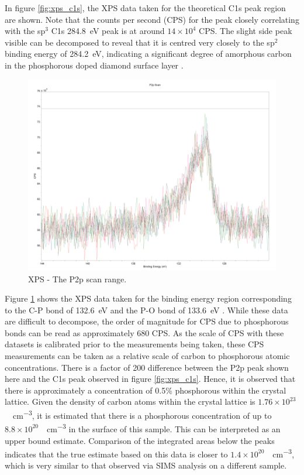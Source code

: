 \begin{refsection}
In figure \ref{fig:xps_c1s}, the XPS data taken for the theoretical C1s peak region are shown. Note that the counts per second (CPS) for the peak closely correlating with the sp$^{3}$ C1s 284.8~\si{\electronvolt} peak \cite{Fang2020} is at around $14\times10^{4}$ CPS. The slight side peak visible can be decomposed to reveal that it is centred very closely to the sp$^{2}$ binding energy of 284.2~\si{\electronvolt}, indicating a significant degree of amorphous carbon in the phosphorous doped diamond surface layer \cite{Fang2020}. 

\begin{figure}[H]
    \centering
    \includegraphics[width=\textwidth]{Chapter3/Figs/xps_P2p.png}
    \caption{XPS - The P2p scan range.}
    \label{fig:xps_p2p}
\end{figure}

Figure \ref{fig:xps_p2p} shows the XPS data taken for the binding energy region corresponding to the C-P bond of 132.6~\si{\electronvolt} and the P-O bond of 133.6~\si{\electronvolt} \cite{Yu2019}. While these data are difficult to decompose, the order of magnitude for CPS due to phosphorous bonds can be read as approximately 680 CPS. As the scale of CPS with these datasets is calibrated prior to the measurements being taken, these CPS measurements can be taken as a relative scale of carbon to phosphorous atomic concentrations. There is a factor of 200 difference between the P2p peak shown here and the C1s peak observed in figure \ref{fig:xps_c1s}. Hence, it is observed that there is approximately a concentration of 0.5\% phosphorous within the crystal lattice. Given the density of carbon atoms within the crystal lattice is $1.76\times10^{23}$~\si{\atoms\per\centi\metre\cubed}, it is estimated that there is a phosphorous concentration of up to $8.8\times10^{20}$~\si{\atoms\per\centi\metre\cubed} in the surface of this sample. This can be interpreted as an upper bound estimate. Comparison of the integrated areas below the peaks indicates that the true estimate based on this data is closer to $1.4\times10^{20}$~\si{\atoms\per\centi\metre\cubed}, which is very similar to that observed via SIMS analysis on a different sample.


\end{refsection}
